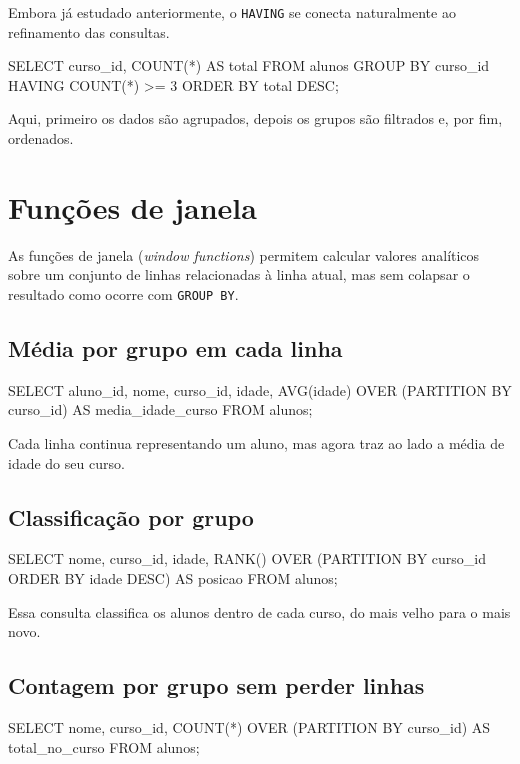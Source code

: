 Embora já estudado anteriormente, o \texttt{HAVING} se conecta naturalmente ao refinamento das consultas.

\begin{sqlcode}
SELECT curso_id, COUNT(*) AS total
FROM alunos
GROUP BY curso_id
HAVING COUNT(*) >= 3
ORDER BY total DESC;
\end{sqlcode}

Aqui, primeiro os dados são agrupados, depois os grupos são filtrados e, por fim, ordenados.

\section{Funções de janela}

As funções de janela (\textit{window functions}) permitem calcular valores analíticos sobre um conjunto de linhas relacionadas à linha atual, mas sem colapsar o resultado como ocorre com \texttt{GROUP BY}.

\subsection{Média por grupo em cada linha}

\begin{sqlcode}
SELECT
    aluno_id,
    nome,
    curso_id,
    idade,
    AVG(idade) OVER (PARTITION BY curso_id) AS media_idade_curso
FROM alunos;
\end{sqlcode}

Cada linha continua representando um aluno, mas agora traz ao lado a média de idade do seu curso.

\subsection{Classificação por grupo}

\begin{sqlcode}
SELECT
    nome,
    curso_id,
    idade,
    RANK() OVER (PARTITION BY curso_id ORDER BY idade DESC) AS posicao
FROM alunos;
\end{sqlcode}

Essa consulta classifica os alunos dentro de cada curso, do mais velho para o mais novo.

\subsection{Contagem por grupo sem perder linhas}

\begin{sqlcode}
SELECT
    nome,
    curso_id,
    COUNT(*) OVER (PARTITION BY curso_id) AS total_no_curso
FROM alunos;
\end{sqlcode}

